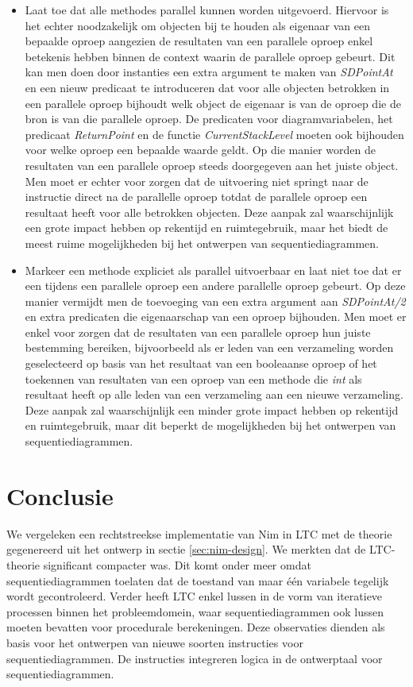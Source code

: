 \begin{itemize}
	\item Laat toe dat alle methodes parallel kunnen worden uitgevoerd. Hiervoor is het echter noodzakelijk om objecten bij te houden als eigenaar van een bepaalde oproep aangezien de resultaten van een parallele oproep enkel betekenis hebben binnen de context waarin de parallele oproep gebeurt. Dit kan men doen door instanties een extra argument te maken van \textit{SDPointAt} en een nieuw predicaat te introduceren dat voor alle objecten betrokken in een parallele oproep bijhoudt welk object de eigenaar is van de oproep die de bron is van die parallele oproep. De predicaten voor diagramvariabelen, het predicaat \textit{ReturnPoint} en de functie \textit{CurrentStackLevel} moeten ook bijhouden voor welke oproep een bepaalde waarde geldt. Op die manier worden de resultaten van een parallele oproep steeds doorgegeven aan het juiste object. Men moet er echter voor zorgen dat de uitvoering niet springt naar de instructie direct na de parallelle oproep totdat de parallele oproep een resultaat heeft voor alle betrokken objecten. Deze aanpak zal waarschijnlijk een grote impact hebben op rekentijd en ruimtegebruik, maar het biedt de meest ruime mogelijkheden bij het ontwerpen van sequentiediagrammen.
	\item Markeer een methode expliciet als parallel uitvoerbaar en laat niet toe dat er een tijdens een parallele oproep een andere parallelle oproep gebeurt. Op deze manier vermijdt men de toevoeging van een extra argument aan \textit{SDPointAt/2} en extra predicaten die eigenaarschap van een oproep bijhouden. Men moet er enkel voor zorgen dat de resultaten van een parallele oproep hun juiste bestemming bereiken, bijvoorbeeld als er leden van een verzameling worden geselecteerd op basis van het resultaat van een booleaanse oproep of het toekennen van resultaten van een oproep van een methode die \textit{int} als resultaat heeft op alle leden van een verzameling aan een nieuwe verzameling. Deze aanpak zal waarschijnlijk een minder grote impact hebben op rekentijd en ruimtegebruik, maar dit beperkt de mogelijkheden bij het ontwerpen van sequentiediagrammen.
\end{itemize}

\section{Conclusie}

We vergeleken een rechtstreekse implementatie van Nim in LTC met de theorie gegenereerd uit het ontwerp in sectie \ref{sec:nim-design}. We merkten dat de LTC-theorie significant compacter was. Dit komt onder meer omdat sequentiediagrammen toelaten dat de toestand van maar \'e\'en variabele tegelijk wordt gecontroleerd. Verder heeft LTC enkel lussen in de vorm van iteratieve processen binnen het probleemdomein, waar sequentiediagrammen ook lussen moeten bevatten voor procedurale berekeningen. Deze observaties dienden als basis voor het ontwerpen van nieuwe soorten instructies voor sequentiediagrammen. De instructies integreren logica in de ontwerptaal voor sequentiediagrammen.

